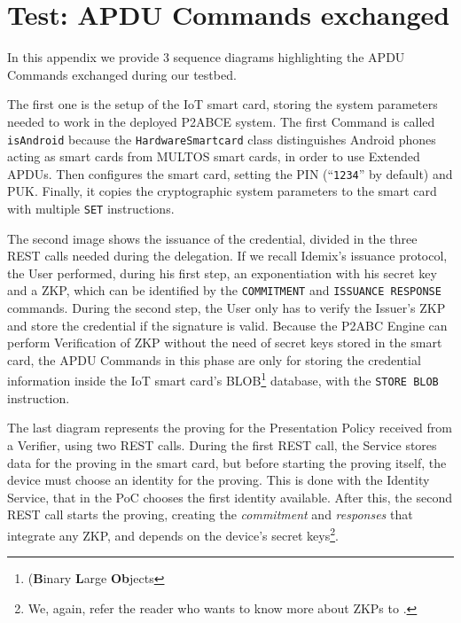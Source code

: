 


\chapter{Test: APDU Commands exchanged}\label{ch:resultsdiagrams}


In this appendix we provide 3 sequence diagrams highlighting the APDU Commands exchanged during our testbed. 


The first one is the setup of the IoT smart card, storing the system parameters needed to work in the deployed P2ABCE system. The first Command is called \texttt{isAndroid} because the \texttt{HardwareSmartcard} class distinguishes Android phones acting as smart cards from MULTOS smart cards, in order to use Extended APDUs. Then configures the smart card, setting the PIN (``\texttt{1234}'' by default) and PUK. Finally, it copies the cryptographic system parameters to the smart card with multiple \texttt{SET} instructions.

The second image shows the issuance of the credential, divided in the three REST calls needed during the delegation. If we recall Idemix's issuance protocol, the User performed, during his first step, an exponentiation with his secret key and a ZKP, which can be identified by the \texttt{COMMITMENT} and \texttt{ISSUANCE RESPONSE} commands. During the second step, the User only has to verify the Issuer's ZKP and store the credential if the signature is valid. Because the P2ABC Engine can perform Verification of ZKP without the need of secret keys stored in the smart card, the APDU Commands in this phase are only for storing the credential information inside the IoT smart card's BLOB\footnote{(\textbf{B}inary \textbf{L}arge \textbf{Ob}jects} database, with the \texttt{STORE BLOB} instruction. 


The last diagram represents the proving for the Presentation Policy received from a Verifier, using two REST calls. During the first REST call, the Service stores data for the proving in the smart card, but before starting the proving itself, the device must choose an identity for the proving. This is done with the Identity Service, that in the PoC chooses the first identity available. After this, the second REST call starts the proving, creating the \textit{commitment} and \textit{responses} that integrate any ZKP, and depends on the device's secret keys\footnote{We, again, refer the reader who wants to know more about ZKPs to \citep{tfgmates}.}.


